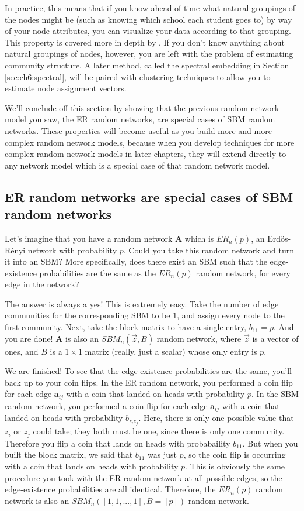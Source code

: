 In practice, this means that if you know ahead of time what natural groupings of the nodes might be (such as knowing which school each student goes to) by way of your node attributes, you can visualize your data according to that grouping. This property is covered more in depth by \cite{Abbe2017Mar}. If you don't know anything about natural groupings of nodes, however, you are left with the problem of {estimating community structure}. A later method, called the {spectral embedding} in Section \ref{sec:ch6:spectral}, will be paired with clustering techniques to allow you to estimate node assignment vectors. 

We'll conclude off this section by showing that the previous random network model you saw, the ER random networks, are special cases of SBM random networks. These properties will become useful as you build more and more complex random network models, because when you develop techniques for more complex random network models in later chapters, they will extend directly to any network model which is a special case of that random network model.

\subsection{ER random networks are special cases of SBM random networks}

Let's imagine that you have a random network $\mathbf A$ which is $ER_n(p)$, an Erd\"os-R\'enyi network with probability $p$. Could you take this random network and turn it into an SBM? More specifically, does there exist an SBM such that the edge-existence probabilities are the same as the $ER_n(p)$ random network, for {every} edge in the network?

The answer is {always} a yes! This is extremely easy. Take the number of edge communities for the corresponding SBM to be $1$, and assign every node to the first community. Next, take the block matrix to have a single entry, $b_{11} = p$. And you are done! $\mathbf A$ is also an $SBM_n(\vec z, B)$ random network, where $\vec z$ is a vector of ones, and $B$ is a $1 \times 1$ matrix (really, just a scalar) whose only entry is $p$.

We are finished! To see that the edge-existence probabilities are the same, you'll back up to your coin flips. In the ER random network, you performed a coin flip for each edge $\mathbf a_{ij}$ with a coin that landed on heads with probability $p$. In the SBM random network, you performed a coin flip for each edge $\mathbf a_{ij}$ with a coin that landed on heads with probability $b_{z_i z_j}$. Here, there is only one possible value that $z_i$ or $z_j$ could take; they both must be one, since there is only one community. Therefore you flip a coin that lands on heads with probabaility $b_{11}$. But when you built the block matrix, we said that $b_{11}$ was just $p$, so the coin flip is occurring with a coin that lands on heads with probability $p$. This is obviously the same procedure you took with the ER random network at all possible edges, so the edge-existence probabilities are all identical. Therefore, the $ER_n(p)$ random network is also an $SBM_n([1, 1, ..., 1], B = [p])$ random network.

